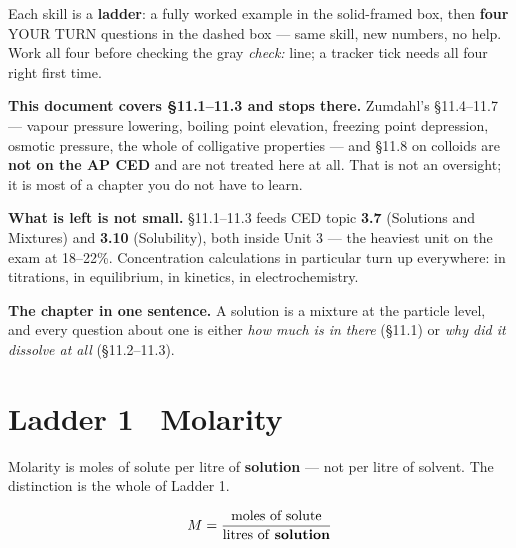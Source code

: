 \documentclass{apchem-worksheet}
\begin{document}
\apctitleblock

\begin{apcnote}
Each skill is a \textbf{ladder}: a fully worked example in the
solid-framed box, then \textbf{four} YOUR TURN questions in the dashed
box --- same skill, new numbers, no help. Work all four before checking
the gray \emph{check:} line; a tracker tick needs all four right first
time.

\textbf{This document covers \S11.1--11.3 and stops there.}
Zumdahl's \S11.4--11.7 --- vapour pressure lowering, boiling point
elevation, freezing point depression, osmotic pressure, the whole of
colligative properties --- and \S11.8 on colloids are \textbf{not on the
AP CED} and are not treated here at all. That is not an oversight; it
is most of a chapter you do not have to learn.

\textbf{What is left is not small.} \S11.1--11.3 feeds CED topic
\textbf{3.7} (Solutions and Mixtures) and \textbf{3.10} (Solubility),
both inside Unit 3 --- the heaviest unit on the exam at 18--22\%.
Concentration calculations in particular turn up everywhere: in
titrations, in equilibrium, in kinetics, in electrochemistry.

\textbf{The chapter in one sentence.} A solution is a mixture at the
particle level, and every question about one is either \emph{how much
is in there} (\S11.1) or \emph{why did it dissolve at all}
(\S11.2--11.3).
\end{apcnote}

\section*{\sffamily Ladder 1 \textbullet\ Molarity}

Molarity is moles of solute per litre of \textbf{solution} --- not per
litre of solvent. The distinction is the whole of Ladder 1.

\[ M = \frac{\text{moles of solute}}{\text{litres of \textbf{solution}}} \]
\end{document}

